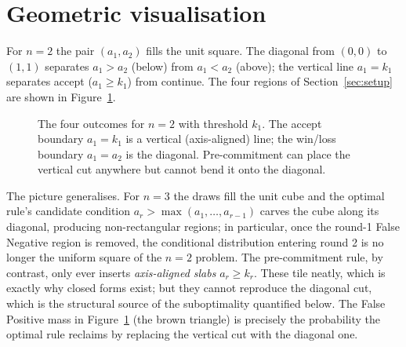 \documentclass[11pt]{article}
\newcommand{\amax}{\operatorname{max}}
\begin{document}
\section{Geometric visualisation}\label{sec:geometry}

For $n=2$ the pair $(a_1,a_2)$ fills the unit square. The diagonal from $(0,0)$ to
$(1,1)$ separates $a_1>a_2$ (below) from $a_1<a_2$ (above); the vertical line
$a_1=k_1$ separates accept ($a_1\ge k_1$) from continue. The four regions of
Section~\ref{sec:setup} are shown in Figure~\ref{fig:square}.

\begin{figure}[h]
\centering
{}
\caption{The four outcomes for $n=2$ with threshold $k_1$. The accept boundary
$a_1=k_1$ is a vertical (axis-aligned) line; the win/loss boundary $a_1=a_2$ is the
diagonal. Pre-commitment can place the vertical cut anywhere but cannot bend it onto
the diagonal.}
\label{fig:square}
\end{figure}

The picture generalises. For $n=3$ the draws fill the unit cube and the optimal rule's
candidate condition $a_r>\amax(a_1,\dots,a_{r-1})$ carves the cube along its diagonal,
producing non-rectangular regions; in particular, once the round-1 False Negative
region is removed, the conditional distribution entering round 2 is no longer the
uniform square of the $n=2$ problem. The pre-commitment rule, by contrast, only ever
inserts \emph{axis-aligned slabs} $a_r\ge k_r$. These tile neatly, which is exactly why
closed forms exist; but they cannot reproduce the diagonal cut, which is the structural
source of the suboptimality quantified below. The False Positive mass in
Figure~\ref{fig:square} (the brown triangle) is precisely the probability the optimal
rule reclaims by replacing the vertical cut with the diagonal one.
\end{document}
